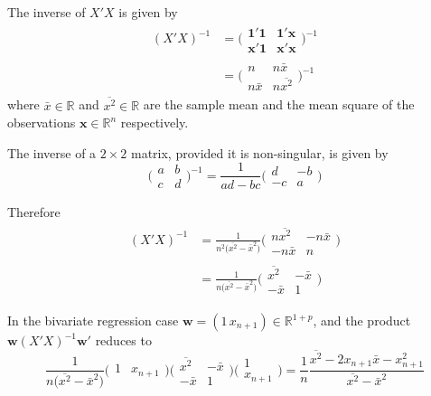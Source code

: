 \documentclass[a4paper]{article}
\newcommand{\w}{\mathbf{w}}
\newcommand{\e}{\mathbf{1}}
\newcommand{\Real}{\mathbb{R}}
\begin{document}
The inverse of $X'X$ is given by
\begin{align*}
 	(X'X)^{-1}
 	&= \bigg(\begin{matrix}\e'\e & \e'\mathbf{x} \\ \mathbf{x}'\e & \mathbf{x}'\mathbf{x}\end{matrix}\bigg)^{-1}\\
 	&= \bigg(\begin{matrix}n & n\bar{x} \\ n\bar{x} & n\overline{x^2}\end{matrix}\bigg)^{-1}
 \end{align*} 
where $\bar{x}\in \Real$ and $\overline{x^2}\in \Real$ are the sample mean and
the mean square of the observations $\mathbf{x}\in \Real^n$ respectively.

The inverse of a $2\times 2$ matrix, provided it is non-singular, is given by
\[\bigg(\begin{matrix} a & b\\c & d\end{matrix}\bigg)^{-1} = \frac{1}{ad-bc}\bigg(\begin{matrix} d & -b\\-c & a\end{matrix}\bigg)\]

Therefore 
\begin{align*}
 	(X'X)^{-1}
 	&= \frac{1}{n^2 \big( \overline{x^2} - \bar{x}^2 \big)} \bigg(\begin{matrix} n\overline{x^2} & -n\bar{x} \\ -n\bar{x} & n \end{matrix}\bigg)\\
 	&= \frac{1}{n \big( \overline{x^2} - \bar{x}^2 \big)} \bigg(\begin{matrix} \overline{x^2} & -\bar{x} \\ -\bar{x} & 1 \end{matrix}\bigg)
\end{align*}

In the bivariate regression case $\w = (1\, x_{n+1})\in \Real^{1+p}$, and the
product $\w (X'X)^{-1}\w'$ reduces to
\[\frac{1}{n \big( \overline{x^2} - \bar{x}^2 \big)} \big(\begin{matrix}1 & x_{n+1}\end{matrix}\big) \bigg(\begin{matrix} \overline{x^2} & -\bar{x} \\ -\bar{x} & 1 \end{matrix}\bigg) \bigg(\begin{matrix}1 \\ x_{n+1}\end{matrix}\bigg) = \frac{1}{n}\frac{ \overline{x^2} - 2 x_{n+1}\bar{x} - x_{n+1}^2 }{ \overline{x^2} - \bar{x}^2} \]
\end{document}
